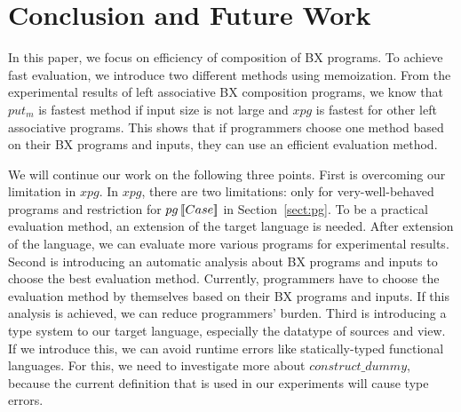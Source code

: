 \section{Conclusion and Future Work} \label{sect:conclusion}

In this paper, we focus on efficiency of composition of BX programs.
To achieve fast evaluation, we introduce two different methods using memoization.
From the experimental results of left associative BX composition programs, we know that $put_m$ is fastest method if input size is not large and $xpg$ is fastest for other left associative programs.
This shows that if programmers choose one method based on their BX programs and inputs, they can use an efficient evaluation method. 


We will continue our work on the following three points.
First is overcoming our limitation in $xpg$. In $xpg$, there are two limitations: only for very-well-behaved programs and restriction for $pg \, [\![Case]\!]$ in Section~\ref{sect:pg}. To be a practical evaluation method, an extension of the target language is needed. After extension of the language, we can evaluate more various programs for experimental results.
Second is introducing an automatic analysis about BX programs and inputs to choose the best evaluation method.
Currently, programmers have to choose the evaluation method by themselves based on their BX programs and inputs. If this analysis is achieved, we can reduce programmers' burden.
Third is introducing a type system to our target language, especially the datatype of sources and view. If we introduce this, we can avoid runtime errors like statically-typed functional languages. For this, we need to investigate more about $construct\_dummy$, because the current definition that is used in our experiments %
will cause type errors. 





